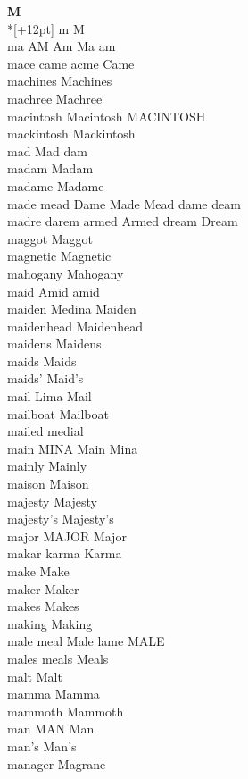 \vspace{14pt}
\noindent\textbf{\Large M}\\*[+12pt]
m M\\
ma AM Am Ma am\\
mace came acme Came\\
machines Machines\\
machree Machree\\
macintosh Macintosh MACINTOSH\\
mackintosh Mackintosh\\
mad Mad dam\\
madam Madam\\
madame Madame\\
made mead Dame Made Mead dame deam\\
madre darem armed Armed dream Dream\\
maggot Maggot\\
magnetic Magnetic\\
mahogany Mahogany\\
maid Amid amid\\
maiden Medina Maiden\\
maidenhead Maidenhead\\
maidens Maidens\\
maids Maids\\
maids' Maid's\\
mail Lima Mail\\
mailboat Mailboat\\
mailed medial\\
main MINA Main Mina\\
mainly Mainly\\
maison Maison\\
majesty Majesty\\
majesty's Majesty's\\
major MAJOR Major\\
makar karma Karma\\
make Make\\
maker Maker\\
makes Makes\\
making Making\\
male meal Male lame MALE\\
males meals Meals\\
malt Malt\\
mamma Mamma\\
mammoth Mammoth\\
man MAN Man\\
man's Man's\\
manager Magrane\\
